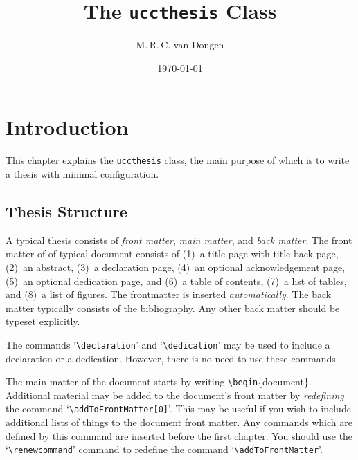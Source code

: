 \documentclass[MScDSA]{uccthesis}
\title{The \texttt{uccthesis} Class}
\author{M.\,R.\,C. van Dongen}
\date{\today}
\newcommand*{\COMMAND}[1]{\texttt{\textbackslash #1}}
\newcommand*{\COMMANDWITHARGUMENT}[2]{\texttt{\textbackslash #1}\{#2\}}
\begin{document}
   \chapter{Introduction}
      This chapter explains the \texttt{uccthesis} class,
       the main purpose of which is to write a thesis
       with minimal configuration.

   \section{Thesis Structure}
      A typical thesis consists of
       \emph{front matter},
       \emph{main matter}, and
       \emph{back matter}.
      The front matter of
        of typical document consists of
       (1)~a title page with title back page,
       (2)~an abstract,
       (3)~a declaration page,
       (4)~an optional acknowledgement page,
       (5)~an optional dedication page, and
       (6)~a table of contents,
       (7)~a list of tables, and
       (8)~a list of figures.
      The frontmatter is inserted \emph{automatically}.
      The back matter typically
       consists of the bibliography.
      Any other back matter should be typeset explicitly.

      The commands `\COMMAND{declaration}' and
       `\COMMAND{dedication}' may be used to
       include a declaration or a dedication.
      However, there is no need to use these commands.

      The main matter of the document
       starts by writing \COMMANDWITHARGUMENT{begin}{document}.
      Additional material may be added
       to the document's front matter by \emph{redefining} the command
       \label{addToFrontMatter}
       `\COMMAND{addToFrontMatter[0]}'.
      This may be useful if you wish to include
       additional lists of things to the document front matter.
      Any commands which are defined by this command
       are inserted before the first chapter.
      You should use the `\COMMAND{renewcommand}'
       command to redefine the command
       `\COMMAND{addToFrontMatter}'.
\end{document}
